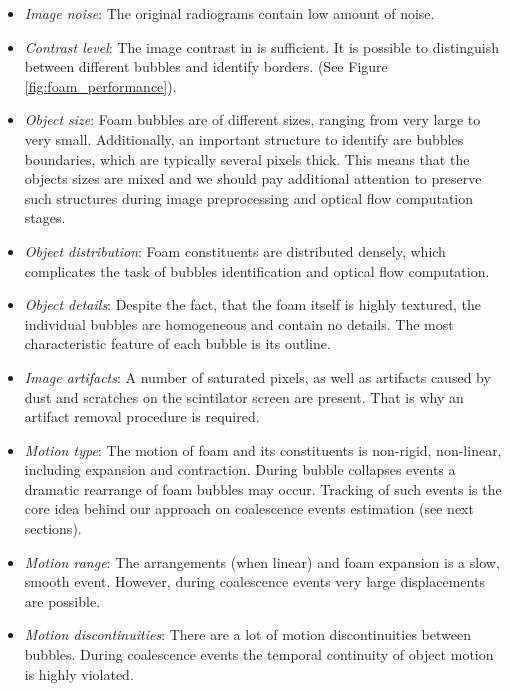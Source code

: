 \begin{itemize}
	\item \textit{Image noise}: The original radiograms contain low amount of noise.  
	
	\item \textit{Contrast level}:  The image contrast in is sufficient.  It is possible to distinguish between different bubbles and identify borders. (See Figure \ref{fig:foam_performance}).
	
	\item \textit{Object size}: Foam bubbles are of different sizes, ranging from very large to very small. Additionally, an important structure to identify are bubbles boundaries, which are typically several pixels thick. This means that the objects sizes are mixed and we should pay additional attention to preserve such structures during image preprocessing and optical flow computation stages.	
	
	\item \textit{Object distribution}: Foam constituents are distributed densely, which complicates the task of bubbles identification and optical flow computation.
	
	\item \textit{Object details}: Despite the fact, that the foam itself is highly textured, the individual bubbles are homogeneous and contain no details. The most characteristic feature of each bubble is its outline.
	
	\item \textit{Image artifacts}: A number of saturated pixels, as well as artifacts caused by dust and scratches on the scintilator screen are present. That is why an artifact removal procedure is required. 
	
	\item \textit{Motion type}: The motion of foam and its constituents is non-rigid, non-linear, including expansion and contraction. During bubble collapses events a dramatic rearrange of foam bubbles may occur. Tracking of such events is the core idea behind our approach on coalescence events estimation (see next sections).
	
	\item \textit{Motion range}: The arrangements (when linear) and foam expansion is a slow, smooth event. However, during coalescence events very large displacements are possible. 
	
	\item \textit{Motion discontinuities}: There are a lot of motion discontinuities between bubbles. During coalescence events the temporal continuity of object motion is highly violated.
\end{itemize}




